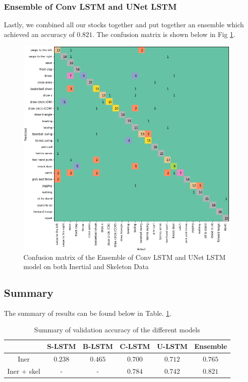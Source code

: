 \documentclass[conference]{IEEEtran}
\begin{document}
\subsubsection{Ensemble of Conv LSTM and UNet LSTM}
Lastly, we combined all our stocks together and put together an ensemble which achieved an accuracy of $0.821$. The confusion matrix is shown below in Fig \ref{fig:confusion_matrix_ensemble_iner_skel}.
\begin{figure}[H]
\begin{center}
\includegraphics[scale=0.3]{ensemble_conv_UNet_LSTM/ensemble_UNet_lstm_confusion_matrix_iner_skel.png}
\end{center}
\caption{\label{fig:confusion_matrix_ensemble_iner_skel} 
Confusion matrix of the Ensemble of Conv LSTM and UNet LSTM model on both Inertial and Skeleton Data}
\end{figure}

\subsection{Summary}
The summary of results can be found below in Table. \ref{tbl:results_summary}. 
\begin{table}[H] 
\caption{Summary of validation accuracy of the different models} \label{tbl:results_summary}
\begin{tabular}{|c|c|c|c|c|c|}
\hline
& S-LSTM & B-LSTM & C-LSTM & U-LSTM & Ensemble \\
\hline
Iner & $0.238$ & $0.465$ & $0.700$ & $0.712$ & $0.765$ \\
\hline
Iner + skel & - & - & $0.784$ & $0.742$ & $0.821$ \\
\hline
\end{tabular}
\end{table}
\end{document}
